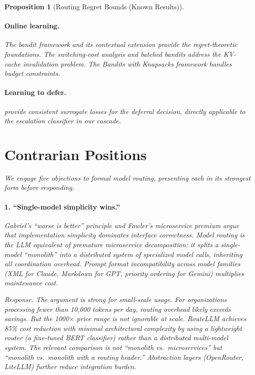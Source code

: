 \documentclass[11pt, a4paper, logo, copyright]{googledeepmind}
\newtheorem{proposition}{Proposition}[section]
\begin{document}
\begin{proposition}[Routing Regret Bounds (Known Results)]
\paragraph{Online learning.} The bandit framework \citep{auer2002, lattimore2020bandits} and its contextual extension \citep{li2010linucb, agarwal2014monster} provide the regret-theoretic foundations. The switching-cost analysis \citep{dekel2014switching} and batched bandits \citep{perchet2016batched} address the KV-cache invalidation problem. The Bandits with Knapsacks framework \citep{badanidiyuru2018bwk} handles budget constraints.

\paragraph{Learning to defer.} \citet{mozannar2020defer} provide consistent surrogate losses for the deferral decision, directly applicable to the escalation classifier in our cascade.


\section{Contrarian Positions}
\label{sec:contrarian}

We engage five objections to formal model routing, presenting each in its strongest form before responding.

\paragraph{1. ``Single-model simplicity wins.''} Gabriel's ``worse is better'' principle \citep{gabriel1989} and Fowler's microservice premium argue that implementation simplicity dominates interface correctness. Model routing is the LLM equivalent of premature microservice decomposition: it splits a single-model ``monolith'' into a distributed system of specialized model calls, inheriting all coordination overhead. Prompt format incompatibility across model families (XML for Claude, Markdown for GPT, priority ordering for Gemini) multiplies maintenance cost.

\emph{Response.} The argument is strong for small-scale usage. For organizations processing fewer than 10,000 tokens per day, routing overhead likely exceeds savings. But the 1000$\times$ price range is not ignorable at scale. RouteLLM achieves 85\% cost reduction with minimal architectural complexity by using a lightweight router (a fine-tuned BERT classifier) rather than a distributed multi-model system. The relevant comparison is not ``monolith vs.\ microservices'' but ``monolith vs.\ monolith with a routing header.'' Abstraction layers (OpenRouter, LiteLLM) further reduce integration burden.


\end{proposition}
\end{document}
